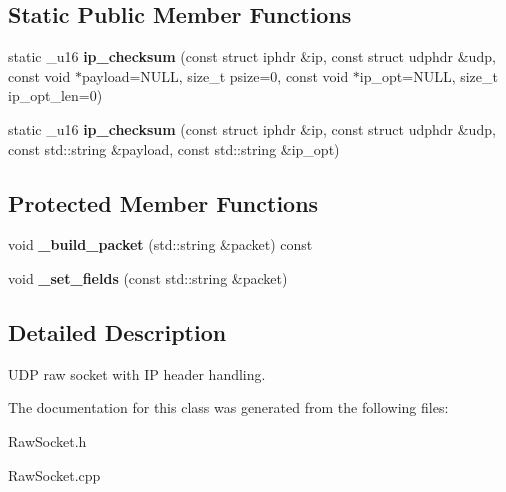 \subsection*{Static Public Member Functions}
\begin{CompactItemize}
\item 
\hypertarget{classsocketpp_1_1UDP__IP__RawSocket_23e1e3f2f4b206d88b6c8ca4e0b514fd}{
static \_\-u16 \textbf{ip\_\-checksum} (const struct iphdr \&ip, const struct udphdr \&udp, const void $\ast$payload=NULL, size\_\-t psize=0, const void $\ast$ip\_\-opt=NULL, size\_\-t ip\_\-opt\_\-len=0)}
\label{classsocketpp_1_1UDP__IP__RawSocket_23e1e3f2f4b206d88b6c8ca4e0b514fd}

\item 
\hypertarget{classsocketpp_1_1UDP__IP__RawSocket_6af969961a1dbe17e2da9f26dce18463}{
static \_\-u16 \textbf{ip\_\-checksum} (const struct iphdr \&ip, const struct udphdr \&udp, const std::string \&payload, const std::string \&ip\_\-opt)}
\label{classsocketpp_1_1UDP__IP__RawSocket_6af969961a1dbe17e2da9f26dce18463}

\end{CompactItemize}
\subsection*{Protected Member Functions}
\begin{CompactItemize}
\item 
\hypertarget{classsocketpp_1_1UDP__IP__RawSocket_25aebd67b52bc7e675930cc812918270}{
void \textbf{\_\-build\_\-packet} (std::string \&packet) const }
\label{classsocketpp_1_1UDP__IP__RawSocket_25aebd67b52bc7e675930cc812918270}

\item 
\hypertarget{classsocketpp_1_1UDP__IP__RawSocket_40fde867fa138b495f660864023a3eb1}{
void \textbf{\_\-set\_\-fields} (const std::string \&packet)}
\label{classsocketpp_1_1UDP__IP__RawSocket_40fde867fa138b495f660864023a3eb1}

\end{CompactItemize}


\subsection{Detailed Description}
UDP raw socket with IP header handling. 

The documentation for this class was generated from the following files:\begin{CompactItemize}
\item 
RawSocket.h\item 
RawSocket.cpp\end{CompactItemize}
